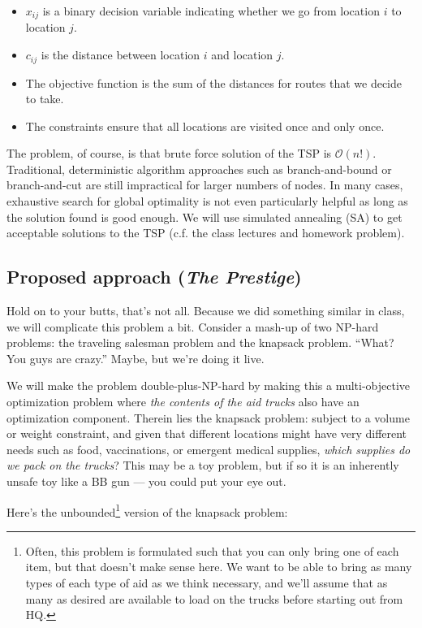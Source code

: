 \documentclass{article} %
\begin{document}
\begin{itemize}
  \item $x_{ij}$ is a binary decision variable indicating whether we go from location $i$ to location $j$.
  \item $c_{ij}$ is the distance between location $i$ and location $j$.
  \item The objective function is the sum of the distances for routes that we decide to take.
  \item The constraints ensure that all locations are visited once and only once.
\end{itemize}

The problem, of course, is that brute force solution of the TSP is $\mathcal{O}$$(n!)$. Traditional, deterministic
algorithm approaches such as branch-and-bound or branch-and-cut are still impractical for larger numbers of nodes.
In many cases, exhaustive search for global optimality is not even particularly helpful as long as the solution
found is good enough. We will use simulated annealing (SA) to get acceptable solutions to the TSP (c.f. the class lectures
and homework problem). 

\subsection*{Proposed approach (\emph{The Prestige})}

Hold on to your butts, that's not all. Because we did something similar in class, we will complicate
this problem a bit. Consider a mash-up of two NP-hard problems: the traveling salesman problem and the
knapsack problem. ``What? You guys are crazy.'' Maybe, but we're doing it live.

We will make the problem double-plus-NP-hard by making this a multi-objective optimization problem
where \emph{the contents of the aid trucks} also have an optimization component. Therein lies
the knapsack problem: subject to a volume or weight constraint, and given that different locations
might have very different needs such as food, vaccinations, or emergent medical supplies, \emph{which
supplies do we pack on the trucks}?  This may be a toy problem, but if so it is an inherently unsafe
toy like a BB gun --- you could put your eye out.

Here's the unbounded\footnote{Often, this problem is formulated such that you can only bring one of
each item, but that doesn't make sense here. We want to be able to bring as many types of each type
of aid as we think necessary, and we'll assume that as many as desired are available to load on the
trucks before starting out from HQ.} version of the knapsack problem:
\end{document}
